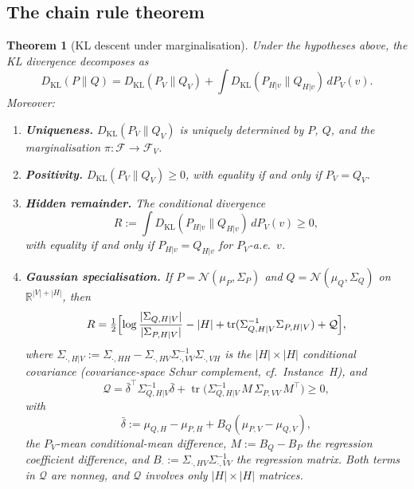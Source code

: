 \documentclass[11pt,a4paper]{article}
\numberwithin{equation}{section}
\DeclareMathOperator{\tr}{tr}
\newcommand{\R}{\mathbb{R}}
\theoremstyle{thmcompact}
\newtheorem{theorem}{Theorem}[section]
\theoremstyle{remark}
\begin{document}
\subsection{The chain rule theorem}

\begin{theorem}[KL descent under marginalisation]\label{thm:bridge-G}
Under the hypotheses above, the KL divergence decomposes as
\begin{equation}\label{eq:G-chain}
D_{\mathrm{KL}}(P \| Q) = D_{\mathrm{KL}}(P_V \| Q_V) + \int D_{\mathrm{KL}}(P_{H|v} \| Q_{H|v})\, dP_V(v).
\end{equation}
Moreover:
\begin{enumerate}[label=\textup{(\roman*)}]
\item \textbf{Uniqueness.} $D_{\mathrm{KL}}(P_V \| Q_V)$ is uniquely determined by $P$, $Q$, and the marginalisation $\pi: \mathcal{F} \to \mathcal{F}_V$.

\item \textbf{Positivity.} $D_{\mathrm{KL}}(P_V \| Q_V) \geq 0$, with equality if and only if $P_V = Q_V$.

\item \textbf{Hidden remainder.} The conditional divergence
\begin{equation}\label{eq:G-remainder}
R := \int D_{\mathrm{KL}}(P_{H|v} \| Q_{H|v})\, dP_V(v) \geq 0,
\end{equation}
with equality if and only if $P_{H|v} = Q_{H|v}$ for $P_V$-a.e.\ $v$.

\item \textbf{Gaussian specialisation.} If $P = \mathcal{N}(\mu_P, \Sigma_P)$ and $Q = \mathcal{N}(\mu_Q, \Sigma_Q)$ on $\R^{|V|+|H|}$, then
\begin{equation}\label{eq:G-gauss-remainder}
R = \tfrac{1}{2}\Bigl[\log\frac{|\Sigma_{Q,H|V}|}{|\Sigma_{P,H|V}|} - |H| + \tr(\Sigma_{Q,H|V}^{-1}\Sigma_{P,H|V}) + \mathcal{Q}\Bigr],
\end{equation}
where $\Sigma_{\cdot,H|V} := \Sigma_{\cdot,HH} - \Sigma_{\cdot,HV}\Sigma_{\cdot,VV}^{-1}\Sigma_{\cdot,VH}$ is the $|H| \times |H|$ conditional covariance (covariance-space Schur complement, cf.\ Instance~H), and
\begin{equation}\label{eq:G-gauss-quad}
\mathcal{Q} = \bar{\delta}^\top\Sigma_{Q,H|V}^{-1}\bar{\delta} + \tr\bigl(\Sigma_{Q,H|V}^{-1}\,M\,\Sigma_{P,VV}\,M^\top\bigr) \geq 0,
\end{equation}
with
\[
\bar{\delta} := \mu_{Q,H} - \mu_{P,H} + B_Q(\mu_{P,V} - \mu_{Q,V}),
\]
the $P_V$-mean conditional-mean difference, $M := B_Q - B_P$ the regression coefficient difference, and $B_\cdot := \Sigma_{\cdot,HV}\Sigma_{\cdot,VV}^{-1}$ the regression matrix. Both terms in $\mathcal{Q}$ are nonneg, and $\mathcal{Q}$ involves only $|H| \times |H|$ matrices.
\end{enumerate}
\end{theorem}
\end{document}
